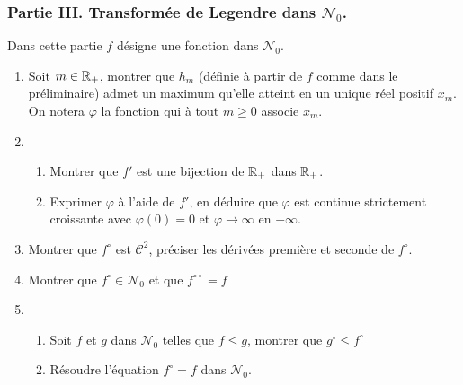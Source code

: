 \subsubsection*{Partie III. Transformée de Legendre dans $\mathcal{N}_0$.}
Dans cette partie $f$ désigne une fonction dans $\mathcal{N}_0$.
\begin{enumerate}
\item Soit $m\in \mathbb{R} _+$, montrer que $h_m$ (définie à partir de $f$ comme dans le préliminaire) admet un maximum qu'elle atteint en un unique réel positif $x_m$. On notera $\varphi$ la fonction qui à tout $m\geq 0$ associe $x_m$.
\item \begin{enumerate}
\item Montrer que $f'$ est une bijection de $\mathbb{R} _+$ dans $\mathbb{R} _+$.
\item Exprimer $\varphi$ à l'aide de $f'$, en déduire que $\varphi$ est continue strictement croissante avec $\varphi (0)=0$ et $\varphi \rightarrow \infty$ en $+\infty$.
\end{enumerate}
\item Montrer que $f^\circ$ est $\mathcal{C}^2$, préciser les dérivées première et seconde de $f^\circ$.
\item Montrer que $f^\circ \in \mathcal{N}_0$ et que $f^{\circ\circ}=f$
\item \begin{enumerate}
\item Soit $f$ et $g$ dans $\mathcal{N}_0$ telles que $f\leq g$, montrer que $g^\circ \leq f^\circ$
\item Résoudre l'équation $f^\circ =f$ dans $\mathcal{N}_0$.
\end{enumerate}
\end{enumerate}

